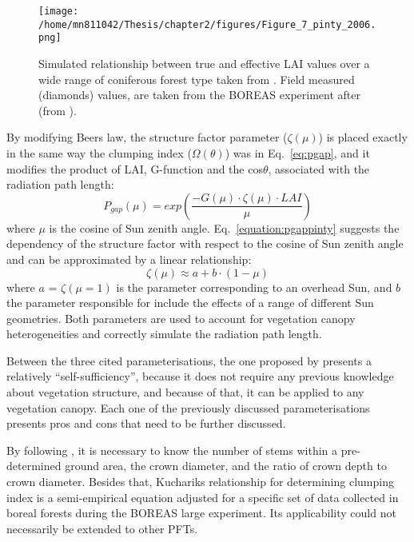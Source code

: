 \begin{figure}[ht!]
\centering
\texttt{[image: /home/mn811042/Thesis/chapter2/figures/Figure\_7\_pinty\_2006.png]}
\caption{Simulated relationship between true and effective LAI values over a wide range of coniferous forest type taken from \citet{Widlowski2004}. Field measured (diamonds) values, are taken from the BOREAS experiment after \citet{Chen1997a} (from \citet{pinty2006}).}
\label{f:pinty2006}
\end{figure}

By modifying Beer\textquotesingle s law, the structure factor parameter ($\zeta(\mu)$) is placed exactly in the same way the clumping index ($\Omega(\theta)$) was in Eq.~\ref{eq:pgap}, and it modifies the product of LAI, G-function \citep{Ross1981} and the cos$\theta$, associated with the radiation path length:
\begin{equation}
P_{gap}(\mu) = exp{(\frac{-G(\mu)\cdot \zeta(\mu) \cdot LAI}{\mu})}
\label{equation:pgappinty}
\end{equation}
\noindent where $\mu$ is the cosine of Sun zenith angle. Eq.~\ref{equation:pgappinty} suggests the dependency of the structure factor with respect to the cosine of Sun zenith angle and can be approximated by a linear relationship:
\begin{equation}
\zeta(\mu) \approx a + b \cdot (1 - \mu)
\label{equation:structurefactor}
\end{equation}
\noindent where $a$ = $\zeta(\mu=1)$ is the parameter corresponding to an overhead Sun, and $b$ the parameter responsible for include the effects of a range of different Sun geometries. Both parameters are used to account for vegetation canopy heterogeneities and correctly simulate the radiation path length. 

Between the three cited parameterisations, the one proposed by \citet{pinty2006} presents a relatively ``self-sufficiency'', because it does not require any previous knowledge about vegetation structure, and because of that, it can be applied to any vegetation canopy. Each one of the previously discussed parameterisations presents pros and cons that need to be further discussed. 

By following \citet{Kucharik1999}, it is necessary to know the number of stems within a pre-determined ground area, the crown diameter, and the ratio of crown depth to crown diameter. Besides that, Kucharik\textquotesingle s relationship for determining clumping index is a semi-empirical equation adjusted for a specific set of data collected in boreal forests during the BOREAS large experiment. Its applicability could not necessarily be extended to other PFTs.

